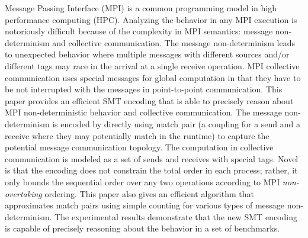Message Passing Interface (MPI) is a common programming model in high performance computing (HPC). 
Analyzing the behavior in any MPI execution is notoriously difficult because of the complexity in MPI semantics: message non-determinism and collective communication. 
The message non-determinism leads to unexpected behavior where multiple messages with different sources and/or different tags may race in the arrival at a single receive operation. 
MPI collective communication uses special messages for global computation in that they have to be not interrupted with the messages in point-to-point communication. 
This paper provides an efficient SMT encoding that is able to precisely reason about MPI non-deterministic behavior and collective communication. The message non-determinism is encoded by directly using match pair (a coupling for a send and a receive where they may potentially match in the runtime) to capture the potential message communication topology. The computation in collective communication is modeled as a set of sends and receives with special tags. Novel is that the encoding does not constrain the total order in each process; rather, it only bounds the sequential order over any two operations according to MPI \textit{non-overtaking} ordering. 
This paper also gives an efficient algorithm that approximates match pairs using simple counting for various types of message non-determinism. 
The experimental results demonstrate that the new SMT encoding is capable of precisely reasoning about the behavior in a set of benchmarks.